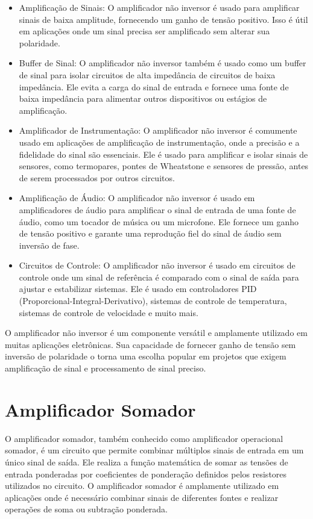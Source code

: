 \documentclass[12pt,twoside, a4paper, twocolumn]{article}
\begin{document}
\begin{itemize}
    \item Amplificação de Sinais: O amplificador não inversor é usado para amplificar sinais de baixa amplitude, fornecendo um ganho de tensão positivo. Isso é útil em aplicações onde um sinal precisa ser amplificado sem alterar sua polaridade.
    \item Buffer de Sinal: O amplificador não inversor também é usado como um buffer de sinal para isolar circuitos de alta impedância de circuitos de baixa impedância. Ele evita a carga do sinal de entrada e fornece uma fonte de baixa impedância para alimentar outros dispositivos ou estágios de amplificação.
    \item Amplificador de Instrumentação: O amplificador não inversor é comumente usado em aplicações de amplificação de instrumentação, onde a precisão e a fidelidade do sinal são essenciais. Ele é usado para amplificar e isolar sinais de sensores, como termopares, pontes de Wheatstone e sensores de pressão, antes de serem processados por outros circuitos.
    \item Amplificação de Áudio: O amplificador não inversor é usado em amplificadores de áudio para amplificar o sinal de entrada de uma fonte de áudio, como um tocador de música ou um microfone. Ele fornece um ganho de tensão positivo e garante uma reprodução fiel do sinal de áudio sem inversão de fase.
    \item Circuitos de Controle: O amplificador não inversor é usado em circuitos de controle onde um sinal de referência é comparado com o sinal de saída para ajustar e estabilizar sistemas. Ele é usado em controladores PID (Proporcional-Integral-Derivativo), sistemas de controle de temperatura, sistemas de controle de velocidade e muito mais.
\end{itemize}


O amplificador não inversor é um componente versátil e amplamente utilizado em muitas aplicações eletrônicas. Sua capacidade de fornecer ganho de tensão sem inversão de polaridade o torna uma escolha popular em projetos que exigem amplificação de sinal e processamento de sinal preciso.


\newpage


\section{Amplificador Somador}


O amplificador somador, também conhecido como amplificador operacional somador, é um circuito que permite combinar múltiplos sinais de entrada em um único sinal de saída. Ele realiza a função matemática de somar as tensões de entrada ponderadas por coeficientes de ponderação definidos pelos resistores utilizados no circuito. O amplificador somador é amplamente utilizado em aplicações onde é necessário combinar sinais de diferentes fontes e realizar operações de soma ou subtração ponderada.
\end{document}
